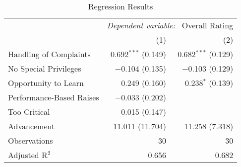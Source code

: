 \documentclass[12pt]{article}
\begin{document}
\begin{table}[h!]
  \caption{Regression Results}
  \label{tab:reg1}
  \begin{center}
    \begin{tabular}{@{} lrr @{}}
      \toprule
      & \multicolumn{2}{c}{\textit{Dependent variable:} \ Overall Rating} \\
      \cmidrule{2-3}
                                & (1)                   & (2)                   \\
      \hline

      Handling of Complaints   & 0.692$^{***}$ (0.149) & 0.682$^{***}$ (0.129) \\
      No Special Privileges    & $-$0.104 (0.135)      & $-$0.103 (0.129)      \\
      Opportunity to Learn     & 0.249 (0.160)         & 0.238$^{*}$ (0.139)   \\
      Performance-Based Raises & $-$0.033 (0.202)      &                       \\
      Too Critical             & 0.015 (0.147)         &                       \\
      Advancement              & 11.011 (11.704)       & 11.258 (7.318)        \\
      \hline
      Observations             & 30                    & 30                    \\
      Adjusted R$^{2}$         & 0.656                 & 0.682                 \\

      \bottomrule
    \end{tabular}

  \end{center}
\end{table}
\end{document}
